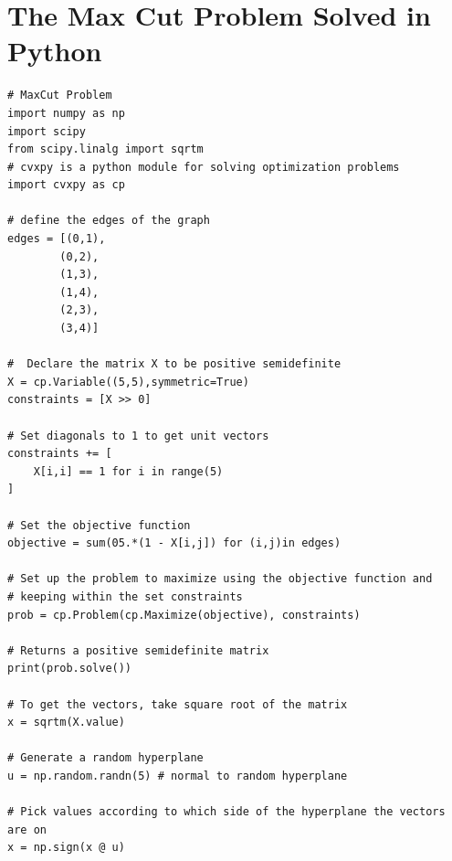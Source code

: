 \section{The Max Cut Problem Solved in Python}
\begin{Verbatim}       
# MaxCut Problem
import numpy as np
import scipy 
from scipy.linalg import sqrtm
# cvxpy is a python module for solving optimization problems
import cvxpy as cp

# define the edges of the graph
edges = [(0,1),
        (0,2),
        (1,3),
        (1,4),
        (2,3),
        (3,4)]

#  Declare the matrix X to be positive semidefinite
X = cp.Variable((5,5),symmetric=True)
constraints = [X >> 0]

# Set diagonals to 1 to get unit vectors
constraints += [
    X[i,i] == 1 for i in range(5)
]

# Set the objective function
objective = sum(05.*(1 - X[i,j]) for (i,j)in edges)

# Set up the problem to maximize using the objective function and
# keeping within the set constraints
prob = cp.Problem(cp.Maximize(objective), constraints)

# Returns a positive semidefinite matrix
print(prob.solve())

# To get the vectors, take square root of the matrix
x = sqrtm(X.value)

# Generate a random hyperplane
u = np.random.randn(5) # normal to random hyperplane

# Pick values according to which side of the hyperplane the vectors are on
x = np.sign(x @ u)  
      
\end{Verbatim}










